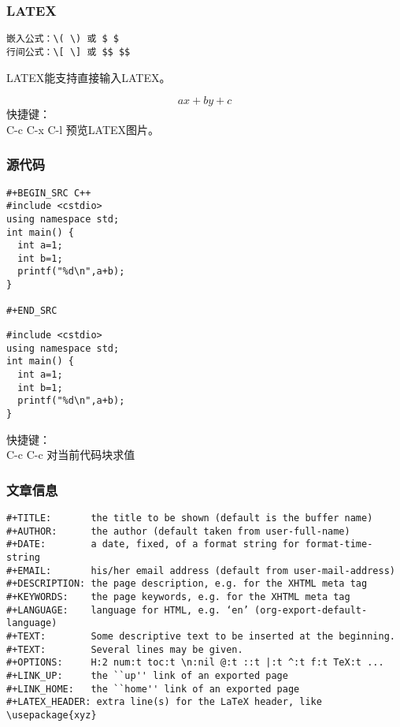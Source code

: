 \documentclass[11pt]{article}
\begin{document}
\subsubsection{LATEX}
\label{sec-2-4-6}

\begin{verbatim}
嵌入公式：\( \) 或 $ $
行间公式：\[ \] 或 $$ $$
\end{verbatim}
LATEX能支持直接输入LATEX。

$$ ax+by+c $$
快捷键：\\
C-c C-x C-l 预览LATEX图片。\\

\subsubsection{源代码}
\label{sec-2-4-7}

\begin{verbatim}
#+BEGIN_SRC C++
#include <cstdio>
using namespace std;
int main() {
  int a=1;
  int b=1;
  printf("%d\n",a+b);
}

#+END_SRC
\end{verbatim}

\begin{verbatim}
#include <cstdio>
using namespace std;
int main() {
  int a=1;
  int b=1;
  printf("%d\n",a+b);
}
\end{verbatim}
快捷键：\\
C-c C-c 对当前代码块求值

\subsubsection{文章信息}
\label{sec-2-4-8}
\begin{verbatim}
#+TITLE:       the title to be shown (default is the buffer name)
#+AUTHOR:      the author (default taken from user-full-name)
#+DATE:        a date, fixed, of a format string for format-time-string
#+EMAIL:       his/her email address (default from user-mail-address)
#+DESCRIPTION: the page description, e.g. for the XHTML meta tag
#+KEYWORDS:    the page keywords, e.g. for the XHTML meta tag
#+LANGUAGE:    language for HTML, e.g. ‘en’ (org-export-default-language)
#+TEXT:        Some descriptive text to be inserted at the beginning.
#+TEXT:        Several lines may be given.
#+OPTIONS:     H:2 num:t toc:t \n:nil @:t ::t |:t ^:t f:t TeX:t ...
#+LINK_UP:     the ``up'' link of an exported page
#+LINK_HOME:   the ``home'' link of an exported page
#+LATEX_HEADER: extra line(s) for the LaTeX header, like \usepackage{xyz}
\end{verbatim}
\end{document}
